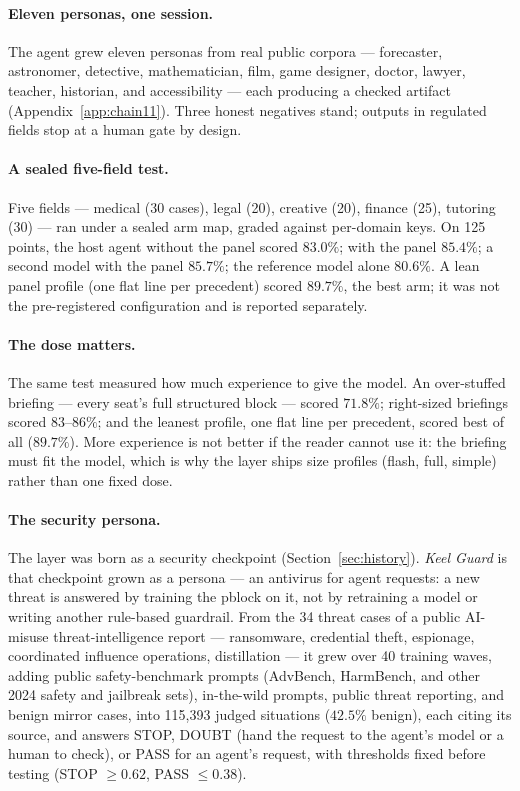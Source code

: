 \documentclass[11pt]{article}
\begin{document}
\paragraph{Eleven personas, one session.} The agent grew eleven personas from real public corpora --- forecaster, astronomer, detective, mathematician, film, game designer, doctor, lawyer, teacher, historian, and accessibility --- each producing a checked artifact (Appendix~\ref{app:chain11}). Three honest negatives stand; outputs in regulated fields stop at a human gate by design.

\paragraph{A sealed five-field test.} Five fields --- medical (30 cases), legal (20), creative (20), finance (25), tutoring (30) --- ran under a sealed arm map, graded against per-domain keys. On 125 points, the host agent without the panel scored $83.0\%$; with the panel $85.4\%$; a second model with the panel $85.7\%$; the reference model alone $80.6\%$. A lean panel profile (one flat line per precedent) scored $89.7\%$, the best arm; it was not the pre-registered configuration and is reported separately. 

\paragraph{The dose matters.} The same test measured how much experience to give the model. An over-stuffed briefing --- every seat's full structured block --- scored $71.8\%$; right-sized briefings scored $83$--$86\%$; and the leanest profile, one flat line per precedent, scored best of all ($89.7\%$). More experience is not better if the reader cannot use it: the briefing must fit the model, which is why the layer ships size profiles (flash, full, simple) rather than one fixed dose.

\paragraph{The security persona.} The layer was born as a security checkpoint (Section~\ref{sec:history}). \emph{Keel Guard} is that checkpoint grown as a persona --- an antivirus for agent requests: a new threat is answered by training the pblock on it, not by retraining a model or writing another rule-based guardrail. From the 34 threat cases of a public AI-misuse threat-intelligence report \cite{anthropic2026misuse} --- ransomware, credential theft, espionage, coordinated influence operations, distillation --- it grew over 40 training waves, adding public safety-benchmark prompts (AdvBench, HarmBench, and other 2024 safety and jailbreak sets), in-the-wild prompts, public threat reporting, and benign mirror cases, into 115{,}393 judged situations ($42.5\%$ benign), each citing its source, and answers STOP, DOUBT (hand the request to the agent's model or a human to check), or PASS for an agent's request, with thresholds fixed before testing (STOP $\geq 0.62$, PASS $\leq 0.38$).
\end{document}
